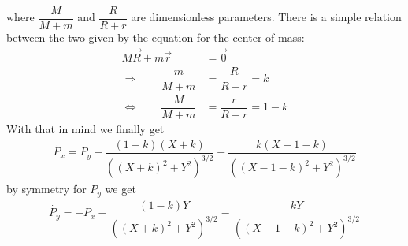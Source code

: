 where $\dfrac{M}{M+m}$ and $\dfrac{R}{R+r}$ are dimensionless parameters. There is a simple relation between the two given by the equation for the center of mass:
\begin{align}
M\vec{R} + m\vec{r} &= \vec{0} \\[0.5cm]
\Rightarrow \qquad \dfrac{m}{M+m} &= \dfrac{R}{R+r} = k \\[0.5cm]
\Leftrightarrow \qquad \dfrac{M}{M+m} &= \dfrac{r}{R+r} = 1-k  
\end{align}
With that in mind we finally get
\begin{align}
\dot{P_x} = P_y - \dfrac{(1-k)(X+k)}{((X+k)^2+Y^2)^{3/2}} - \dfrac{k(X-1-k)}{((X-1-k)^2+Y^2)^{3/2}}
\end{align}
by symmetry for $P_y$ we get
\begin{align}
\dot{P_y} = -P_x - \dfrac{(1-k)Y}{((X+k)^2+Y^2)^{3/2}} - \dfrac{k Y}{((X-1-k)^2+Y^2)^{3/2}}
\end{align}